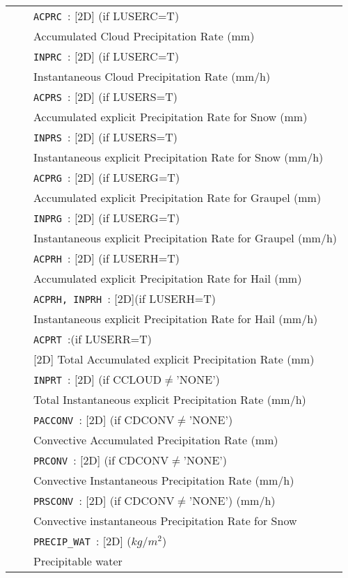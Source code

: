 \begin{center}
\begin{makeimage}
\begin{tabular}{|>{\centering}p{3cm}|>{\centering}p{2.5cm}|p{11cm}|}
& &{\tt ACPRC }: [2D] (if LUSERC=T)\\
&& Accumulated Cloud Precipitation Rate (mm)\\\cline{3-3}
& &{\tt INPRC }: [2D] (if LUSERC=T)\\
&& Instantaneous Cloud Precipitation Rate (mm/h)\\\cline{3-3}
& &{\tt ACPRS }: [2D] (if LUSERS=T)\\
&& Accumulated explicit Precipitation Rate for Snow (mm) \\\cline{3-3}
& &{\tt INPRS }: [2D] (if LUSERS=T) \\
&& Instantaneous explicit Precipitation Rate for Snow (mm/h)  \\\cline{3-3}
& &{\tt ACPRG }: [2D] (if LUSERG=T)\\
&& Accumulated explicit Precipitation Rate for Graupel (mm) \\\cline{3-3}
& &{\tt INPRG }: [2D] (if LUSERG=T)\\
&& Instantaneous explicit Precipitation Rate for Graupel (mm/h)\\\cline{3-3}
& &{\tt ACPRH }: [2D] (if LUSERH=T)\\
&& Accumulated explicit Precipitation Rate for Hail (mm)\\\cline{3-3}
& &{\tt ACPRH, INPRH }: [2D](if LUSERH=T)\\
&& Instantaneous explicit Precipitation Rate for Hail (mm/h) \\\cline{3-3}
& &{\tt ACPRT }:(if LUSERR=T)\\
&& [2D] Total Accumulated explicit Precipitation Rate (mm) \\\cline{3-3}
& &{\tt INPRT }: [2D] (if CCLOUD$\neq$'NONE')\\
&& Total Instantaneous explicit Precipitation Rate (mm/h) \\\cline{3-3}
& &{\tt PACCONV }: [2D] (if CDCONV$\neq$'NONE')\\
&&Convective Accumulated Precipitation Rate (mm)\\\cline{3-3}
& &{\tt PRCONV }: [2D] (if CDCONV$\neq$'NONE')\\
&& Convective Instantaneous Precipitation Rate (mm/h)\\\cline{3-3}
& &{\tt PRSCONV }: [2D] (if CDCONV$\neq$'NONE')  (mm/h) \\
&& Convective instantaneous Precipitation Rate for Snow  \\ \cline{3-3}
& &{\tt PRECIP\_WAT }: [2D]   ($kg/m^2$) \\
&&  Precipitable water \\ \hline
\end{tabular} 
\end{makeimage}
\end{center}

